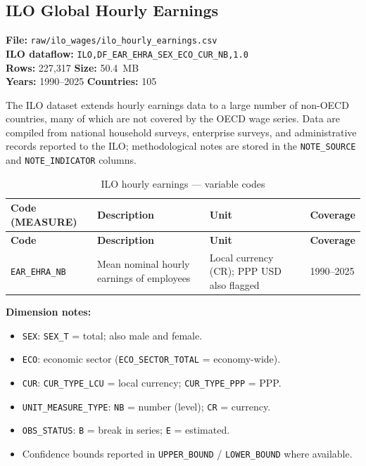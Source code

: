 \documentclass[11pt,a4paper]{article}
\begin{document}
\subsection{ILO Global Hourly Earnings}
\label{subsec:ilo_wages}

\textbf{File:} \texttt{raw/ilo\_wages/ilo\_hourly\_earnings.csv}\\
\textbf{ILO dataflow:} \texttt{ILO,DF\_EAR\_EHRA\_SEX\_ECO\_CUR\_NB,1.0}\\
\textbf{Rows:} 227{,}317 \quad \textbf{Size:} 50.4~MB\\
\textbf{Years:} 1990--2025 \quad \textbf{Countries:} 105

The ILO dataset extends hourly earnings data to a large number of non-OECD
countries, many of which are not covered by the OECD wage series.  Data are
compiled from national household surveys, enterprise surveys, and administrative
records reported to the ILO; methodological notes are stored in the
\texttt{NOTE\_SOURCE} and \texttt{NOTE\_INDICATOR} columns.

\begin{longtable}{L{2.8cm} L{5.5cm} C{2.2cm} C{2.5cm}}
    \caption{ILO hourly earnings --- variable codes}
    \label{tab:ilo_wages}\\
    \toprule
    \textbf{Code (MEASURE)} & \textbf{Description} & \textbf{Unit} & \textbf{Coverage} \\
    \midrule
    \endfirsthead
    \toprule
    \textbf{Code} & \textbf{Description} & \textbf{Unit} & \textbf{Coverage} \\
    \midrule
    \endhead
    \bottomrule
    \endlastfoot
    \texttt{EAR\_EHRA\_NB} & Mean nominal hourly earnings of employees & Local currency (CR); PPP USD also flagged & 1990--2025 \\
\end{longtable}

\noindent\textbf{Dimension notes:}
\begin{itemize}[noitemsep]
    \item \texttt{SEX}: \texttt{SEX\_T} = total; also male and female.
    \item \texttt{ECO}: economic sector (\texttt{ECO\_SECTOR\_TOTAL} = economy-wide).
    \item \texttt{CUR}: \texttt{CUR\_TYPE\_LCU} = local currency; \texttt{CUR\_TYPE\_PPP} = PPP.
    \item \texttt{UNIT\_MEASURE\_TYPE}: \texttt{NB} = number (level); \texttt{CR} = currency.
    \item \texttt{OBS\_STATUS}: \texttt{B} = break in series; \texttt{E} = estimated.
    \item Confidence bounds reported in \texttt{UPPER\_BOUND} / \texttt{LOWER\_BOUND} where
    available.
\end{itemize}
\end{document}
